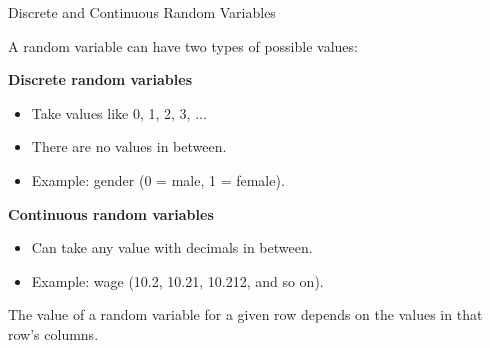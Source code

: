 \documentclass{beamer}
\begin{document}
\begin{frame}{Discrete and Continuous Random Variables}

A random variable can have two types of possible values:

\medskip

\textbf{Discrete random variables}
\begin{itemize}
    \item Take values like 0, 1, 2, 3, ...
    \item There are no values in between.
    \item Example: gender (0 = male, 1 = female).
\end{itemize}

\medskip

\textbf{Continuous random variables}
\begin{itemize}
    \item Can take any value with decimals in between.
    \item Example: wage (10.2, 10.21, 10.212, and so on).
\end{itemize}

\medskip

The value of a random variable for a given row  
depends on the values in that row's columns.

\end{frame}
\end{document}

